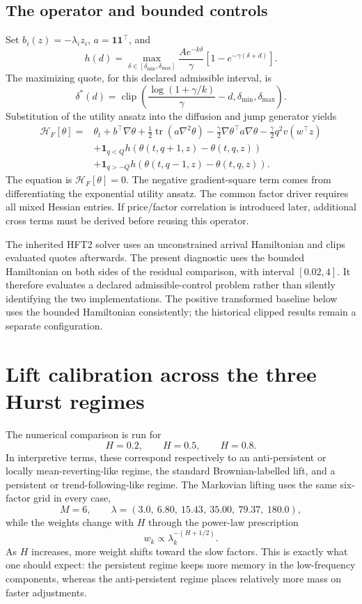 \subsection{The operator and bounded controls}
Set $b_i(z)=-\lambda_i z_i$, $a=\mathbf1\mathbf1^\top$, and
\[
 h(d)=\max_{\delta\in[\delta_{\min},\delta_{\max}]}
 \frac{A e^{-k\delta}}\gamma\left[1-e^{-\gamma(\delta+d)}\right].
\]
The maximizing quote, for this declared admissible interval, is
\[
 \delta^*(d)=\operatorname{clip}\!\left(
 \frac{\log(1+\gamma/k)}\gamma-d,
 \delta_{\min},\delta_{\max}\right).
\]
Substitution of the utility ansatz into the diffusion and jump generator yields
\begin{align*}
 \mathcal H_F[\theta]={}&\theta_t+b^\top\nabla\theta
 +\tfrac12\operatorname{tr}(a\nabla^2\theta)
 -\tfrac\gamma2\nabla\theta^\top a\nabla\theta
 -\tfrac\gamma2q^2v(w^\top z)\\
 &+\mathbf1_{q<Q}h(\theta(t,q+1,z)-\theta(t,q,z))\\
 &+\mathbf1_{q>-Q}h(\theta(t,q-1,z)-\theta(t,q,z)).
\end{align*}
The equation is $\mathcal H_F[\theta]=0$. The negative gradient-square term comes from differentiating the exponential utility ansatz. The common factor driver requires all mixed Hessian entries. If price/factor correlation is introduced later, additional cross terms must be derived before reusing this operator.

The inherited HFT2 solver uses an unconstrained arrival Hamiltonian and clips evaluated quotes afterwards. The present diagnostic uses the bounded Hamiltonian on both sides of the residual comparison, with interval $[0.02,4]$. It therefore evaluates a declared admissible-control problem rather than silently identifying the two implementations. The positive transformed baseline below uses the bounded Hamiltonian consistently; the historical clipped results remain a separate configuration.
\section{Lift calibration across the three Hurst regimes}

The numerical comparison is run for
\[
H=0.2,\qquad H=0.5,\qquad H=0.8.
\]
In interpretive terms, these correspond respectively to an anti-persistent or locally mean-reverting-like regime, the standard Brownian-labelled lift, and a persistent or trend-following-like regime. The Markovian lifting uses the same six-factor grid in every case,
\[
M=6,
\qquad
\lambda=(3.0,\ 6.80,\ 15.43,\ 35.00,\ 79.37,\ 180.0),
\]
while the weights change with \(H\) through the power-law prescription
\[
w_k \propto \lambda_k^{-(H+1/2)}.
\]
As \(H\) increases, more weight shifts toward the slow factors. This is exactly what one should expect: the persistent regime keeps more memory in the low-frequency components, whereas the anti-persistent regime places relatively more mass on faster adjustments.


